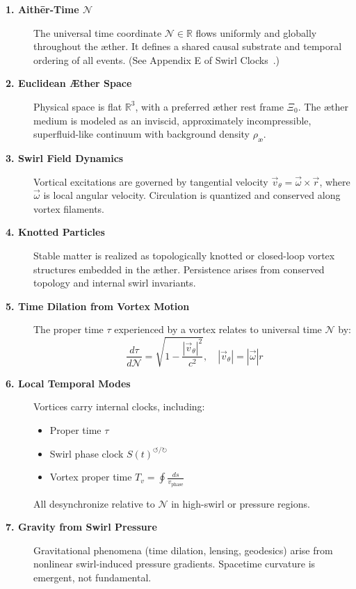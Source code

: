    \begin{description}
        \item[\textbf{1. Aithēr-Time \(\mathcal{N}\)}]%
        The universal time coordinate \( \mathcal{N} \in \mathbb{R} \) flows uniformly and globally throughout the æther. It defines a shared
        causal substrate and temporal ordering of all events. (See Appendix E of Swirl Clocks~\cite{iskandarani2025vam2}.)

        \item[\textbf{2. Euclidean Æther Space}]%
        Physical space is flat \( \mathbb{R}^3 \), with a preferred æther rest frame \( \Xi_0 \). The æther medium is modeled as an inviscid, approximately incompressible, superfluid-like continuum with background density \( \rho_{\text{\ae}} \).

        \item[\textbf{3. Swirl Field Dynamics}]%
        Vortical excitations are governed by tangential velocity \( \vec{v}_\theta = \vec{\omega} \times \vec{r} \), where \( \vec{\omega} \) is local angular velocity. Circulation is quantized and conserved along vortex filaments.

        \item[\textbf{4. Knotted Particles}]%
        Stable matter is realized as topologically knotted or closed-loop vortex structures embedded in the æther. Persistence arises from conserved topology and internal swirl invariants.

        \item[\textbf{5. Time Dilation from Vortex Motion}]%
        The proper time \( \tau \) experienced by a vortex relates to universal time \( \mathcal{N} \) by:
        \begin{equation}
            \boxed{
                \frac{d\tau}{d\mathcal{N}} = \sqrt{1 - \frac{|\vec{v}_\theta|^2}{c^2}}, \quad |\vec{v}_\theta| = |\vec{\omega}| r
            }
            \label{eq:tau-dilation}
        \end{equation}


        \item[\textbf{6. Local Temporal Modes}]%
        Vortices carry internal clocks, including:
        \begin{itemize}
            \item Proper time \( \tau \)
            \item Swirl phase clock \( S(t)^{\circlearrowleft\!/\!\circlearrowright} \)
            \item Vortex proper time \( T_v = \oint \frac{ds}{v_\text{phase}} \)
        \end{itemize}
        All desynchronize relative to \( \mathcal{N} \) in high-swirl or pressure regions.

        \item[\textbf{7. Gravity from Swirl Pressure}]%
        Gravitational phenomena (time dilation, lensing, geodesics) arise from nonlinear swirl-induced pressure gradients. Spacetime curvature is emergent, not fundamental.
    \end{description}

